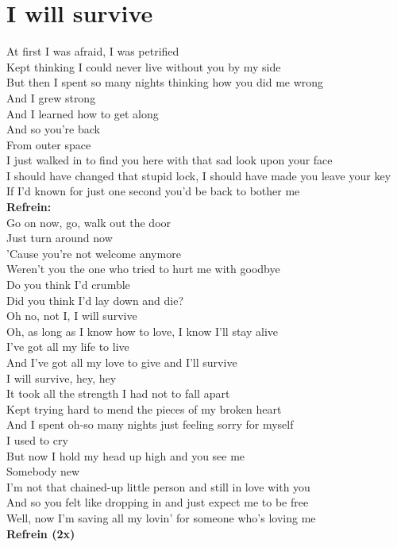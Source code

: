 \section{I will survive}
At first I was afraid, I was petrified\\
Kept thinking I could never live without you by my side\\
But then I spent so many nights thinking how you did me wrong\\
And I grew strong\\
And I learned how to get along\\
And so you're back\\
From outer space\\
I just walked in to find you here with that sad look upon your face\\
I should have changed that stupid lock, I should have made you leave your key\\
If I'd known for just one second you'd be back to bother me\\

\textbf{Refrein:}\\
Go on now, go, walk out the door\\
Just turn around now\\
'Cause you're not welcome anymore\\
Weren't you the one who tried to hurt me with goodbye\\
Do you think I'd crumble\\
Did you think I'd lay down and die?\\
Oh no, not I, I will survive\\
Oh, as long as I know how to love, I know I'll stay alive\\
I've got all my life to live\\
And I've got all my love to give and I'll survive\\
I will survive, hey, hey\\

It took all the strength I had not to fall apart\\
Kept trying hard to mend the pieces of my broken heart\\
And I spent oh-so many nights just feeling sorry for myself\\
I used to cry\\
But now I hold my head up high and you see me\\
Somebody new\\
I'm not that chained-up little person and still in love with you\\
And so you felt like dropping in and just expect me to be free\\
Well, now I'm saving all my lovin' for someone who's loving me\\

\textbf{Refrein (2x)}